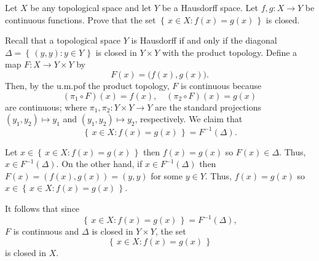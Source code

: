 \begin{problem}
  Let \(X\) be any topological space and let \(Y\) be a Hausdorff
  space. Let \(f,g\colon X\to Y\) be continuous functions. Prove that the
  set \(\left\{\,x\in X:f(x)=g(x)\,\right\}\) is closed.
\end{problem}
\begin{solution}
  Recall that a topological space $Y$ is Hausdorff if and only if the
  diagonal $\Delta=\left\{\,(y,y):y\in Y\,\right\}$ is closed in
  $Y\times Y$ with the product topology. Define a map \(F\colon X\to
  Y\times Y\) by
  \[
    F(x)=\bigl(f(x),g(x)\bigr).
  \]
  Then, by the u.m.p\@ of the product topology, \(F\) is continuous because
  \[
    (\pi_1\circ F)(x)=f(x),\quad(\pi_2\circ F)(x)=g(x)
  \]
  are continuous; where \(\pi_1,\pi_2\colon Y\times Y\to Y\) are the
  standard projections \((y_1,y_2)\mapsto y_1\) and \((y_1,y_2)\mapsto
  y_2\), respectively. We claim that
  \[
    \left\{\,x\in X:f(x)=g(x)\,\right\}=F^{-1}(\Delta).
  \]

  Let \(x\in\left\{\,x\in X:f(x)=g(x)\,\right\}\) then \(f(x)=g(x)\) so
  \(F(x)\in\Delta\). Thus, \(x\in F^{-1}(\Delta)\). On the other hand, if
  \(x\in F^{-1}(\Delta)\) then \(F(x)=(f(x),g(x))=(y,y)\) for some \(y\in
  Y\). Thus, \(f(x)=g(x)\) so \(x\in\left\{\,x\in X:f(x)=g(x)\,\right\}\).

  It follows that since
  \[
    \left\{\,x\in X:f(x)=g(x)\,\right\}=F^{-1}(\Delta),
  \]
  \(F\) is continuous and \(\Delta\) is closed in \(Y\times Y\), the set
  \[
    \left\{\,x\in X:f(x)=g(x)\,\right\}
  \]
  is closed in \(X\).
\end{solution}


